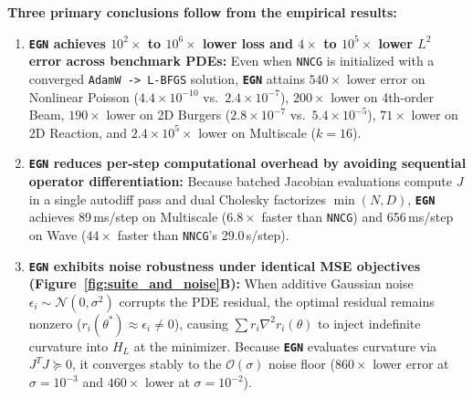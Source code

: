 \documentclass[10pt]{article}
\begin{document}
\textbf{Three primary conclusions follow from the empirical results:}
\begin{enumerate}[leftmargin=1.4em,itemsep=0.08em,topsep=0.08em]
    \item \textbf{\texttt{EGN} achieves $10^2\times$ to $10^6\times$ lower loss and $4\times$ to $10^5\times$ lower $L^2$ error across benchmark PDEs:} Even when \texttt{NNCG} is initialized with a converged \texttt{AdamW -> L-BFGS} solution, \textbf{\texttt{EGN}} attains $540\times$ lower error on Nonlinear Poisson ($4.4 \times 10^{-10}$ vs.\ $2.4 \times 10^{-7}$), $200\times$ lower on 4th-order Beam, $190\times$ lower on 2D Burgers ($2.8 \times 10^{-7}$ vs.\ $5.4 \times 10^{-5}$), $71\times$ lower on 2D Reaction, and $2.4 \times 10^5\times$ lower on Multiscale ($k=16$).
    \item \textbf{\texttt{EGN} reduces per-step computational overhead by avoiding sequential operator differentiation:} Because batched Jacobian evaluations compute $J$ in a single autodiff pass and dual Cholesky factorizes $\min(N, D)$, \textbf{\texttt{EGN}} achieves 89\,ms/step on Multiscale ($6.8\times$ faster than \texttt{NNCG}) and 656\,ms/step on Wave ($44\times$ faster than \texttt{NNCG}'s 29.0\,s/step).
    \item \textbf{\texttt{EGN} exhibits noise robustness under identical MSE objectives (Figure~\ref{fig:suite_and_noise}B):} When additive Gaussian noise $\epsilon_i \sim \mathcal{N}(0, \sigma^2)$ corrupts the PDE residual, the optimal residual remains nonzero ($r_i(\theta^*) \approx \epsilon_i \neq 0$), causing $\sum r_i \nabla^2 r_i(\theta)$ to inject indefinite curvature into $H_L$ at the minimizer. Because \textbf{\texttt{EGN}} evaluates curvature via $J^T J \succeq 0$, it converges stably to the $\mathcal{O}(\sigma)$ noise floor ($860\times$ lower error at $\sigma = 10^{-3}$ and $460\times$ lower at $\sigma = 10^{-2}$).
\end{enumerate}
\end{document}

